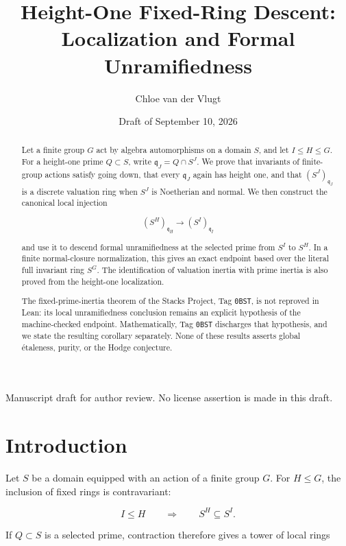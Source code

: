 \documentclass[11pt]{article}
\title{Height-One Fixed-Ring Descent:\\
  Localization and Formal Unramifiedness}
\author{Chloe van der Vlugt}
\date{Draft of September 10, 2026}
\theoremstyle{remark}
\newcommand{\q}{\mathfrak q}
\begin{document}
\maketitle

\begin{abstract}
Let a finite group \(G\) act by algebra automorphisms on a domain \(S\),
and let \(I\leq H\leq G\).  For a height-one prime \(Q\subset S\), write
\(\q_J=Q\cap S^J\).  We prove that invariants of finite-group actions
satisfy going down, that every \(\q_J\) again has height one, and that
\((S^J)_{\q_J}\) is a discrete valuation ring when \(S^J\) is Noetherian
and normal.  We then construct the canonical local injection

\[
  (S^H)_{\q_H}\longrightarrow (S^I)_{\q_I}
\]

and use it to descend formal unramifiedness at the selected prime from
\(S^I\) to \(S^H\).  In a finite normal-closure normalization, this gives
an exact endpoint based over the literal full invariant ring \(S^G\).
The identification of valuation inertia with prime inertia is also proved
from the height-one localization.

The fixed-prime-inertia theorem of the Stacks Project, Tag \texttt{0BST},
is not reproved in Lean: its local unramifiedness conclusion remains an
explicit hypothesis of the machine-checked endpoint.  Mathematically,
Tag \texttt{0BST} discharges that hypothesis, and we state the resulting
corollary separately.  None of these results asserts global \'etaleness,
purity, or the Hodge conjecture.
\end{abstract}

\begin{center}
  \small Manuscript draft for author review.  No license assertion is
  made in this draft.
\end{center}

\begingroup
\small
\tableofcontents
\endgroup

\section{Introduction}
\label{sec:introduction}

Let \(S\) be a domain equipped with an action of a finite group \(G\).
For \(H\leq G\), the inclusion of fixed rings is contravariant:

\[
  I\leq H
  \qquad\Longrightarrow\qquad
  S^H\subseteq S^I.
\]

If \(Q\subset S\) is a selected prime, contraction therefore gives a
tower of local rings
\end{document}
